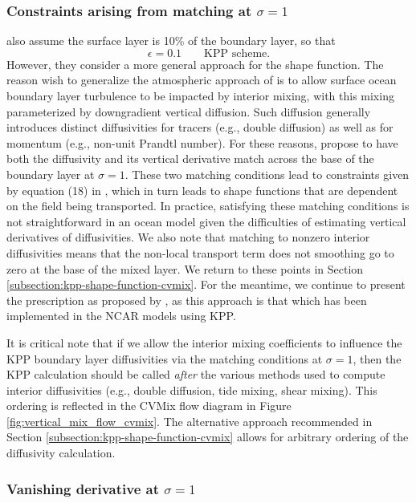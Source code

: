 \subsubsection{Constraints arising from matching at $\sigma=1$}

\cite{LargeKPP} also assume the surface layer is 10\% of the boundary
layer, so that 
\begin{equation}
 \epsilon = 0.1 \qquad \mbox{KPP scheme.}
\end{equation}
However, they consider a more general approach for the shape function.
The reason \cite{LargeKPP} wish to generalize the atmospheric approach
of \cite{Troen_Mahrt1986} is to allow surface ocean boundary layer
turbulence to be impacted by interior mixing, with this mixing
parameterized by downgradient vertical diffusion.  Such diffusion
generally introduces distinct diffusivities for tracers (e.g., double
diffusion) as well as for momentum (e.g., non-unit Prandtl number).
For these reasons, \cite{LargeKPP} propose to have both the
diffusivity and its vertical derivative match across the base of the
boundary layer at $\sigma=1$.  These two matching conditions lead to
constraints given by equation (18) in \cite{LargeKPP}, which in turn
leads to shape functions that are dependent on the field being
transported.  In practice, satisfying these matching conditions is not
straightforward in an ocean model given the difficulties of estimating
vertical derivatives of diffusivities.  We also note that matching to
nonzero interior diffusivities means that the non-local transport term
does not smoothing go to zero at the base of the mixed layer.  We
return to these points in Section
\ref{subsection:kpp-shape-function-cvmix}. For the meantime, we
continue to present the prescription as proposed by \cite{LargeKPP},
as this approach is that which has been implemented in the NCAR models
using KPP.

It is critical note that if we allow the interior mixing coefficients
to influence the KPP boundary layer diffusivities via the matching
conditions at $\sigma=1$, then the KPP calculation should be called
{\it after} the various methods used to compute interior diffusivities
(e.g., double diffusion, tide mixing, shear mixing).  This ordering is
reflected in the CVMix flow diagram in Figure
\ref{fig:vertical_mix_flow_cvmix}.  The alternative approach
recommended in Section \ref{subsection:kpp-shape-function-cvmix}
allows for arbitrary ordering of the diffusivity calculation.


\subsubsection{Vanishing derivative at $\sigma=1$}

